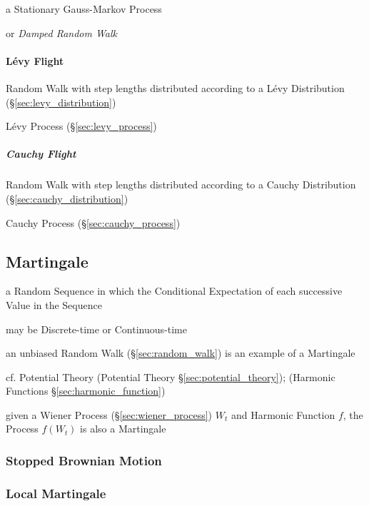 a Stationary Gauss-Markov Process

or \emph{Damped Random Walk}



\paragraph{L\'evy Flight}\label{sec:levy_flight}\hfill

Random Walk with step lengths distributed according to a L\'evy Distribution
(\S\ref{sec:levy_distribution})

\fist L\'evy Process (\S\ref{sec:levy_process})



\subparagraph{Cauchy Flight}\label{sec:cauchy_flight}\hfill

Random Walk with step lengths distributed according to a Cauchy Distribution
(\S\ref{sec:cauchy_distribution})

\fist Cauchy Process (\S\ref{sec:cauchy_process})



\subsection{Martingale}\label{sec:martingale}

a Random Sequence in which the Conditional Expectation of each successive Value
in the Sequence

may be Discrete-time or Continuous-time

an unbiased Random Walk (\S\ref{sec:random_walk}) is an example of a Martingale

\fist cf. Potential Theory (Potential Theory \S\ref{sec:potential_theory});
(Harmonic Functions \S\ref{sec:harmonic_function})

given a Wiener Process (\S\ref{sec:wiener_process}) $W_t$ and Harmonic Function
$f$, the Process $f(W_t)$ is also a Martingale



\subsubsection{Stopped Brownian Motion}\label{sec:stopped_brownian_motion}

\subsubsection{Local Martingale}\label{sec:local_martingale}

